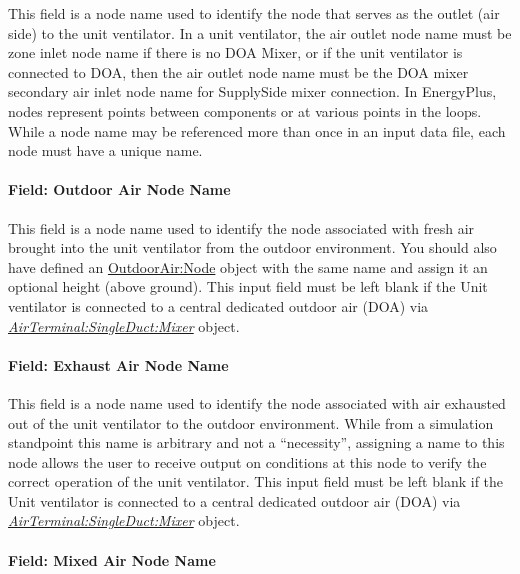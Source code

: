 This field is a node name used to identify the node that serves as the outlet (air side) to the unit ventilator. In a unit ventilator, the air outlet node name must be zone inlet node name if there is no DOA Mixer, or if the unit ventilator is connected to DOA, then the air outlet node name must be the DOA mixer secondary air inlet node name for SupplySide mixer connection. In EnergyPlus, nodes represent points between components or at various points in the loops. While a node name may be referenced more than once in an input data file, each node must have a unique name.

\paragraph{Field: Outdoor Air Node Name}\label{field-outdoor-air-node-name-001}

This field is a node name used to identify the node associated with fresh air brought into the unit ventilator from the outdoor environment. You should also have defined an \hyperref[outdoorairnode]{OutdoorAir:Node} object with the same name and assign it an optional height (above ground). This input field must be left blank if the Unit ventilator is connected to a central dedicated outdoor air (DOA) via \textit{\hyperref[airterminalsingleductmixer]{AirTerminal:SingleDuct:Mixer}} object.

\paragraph{Field: Exhaust Air Node Name}\label{field-exhaust-air-node-name-000}

This field is a node name used to identify the node associated with air exhausted out of the unit ventilator to the outdoor environment. While from a simulation standpoint this name is arbitrary and not a ``necessity'', assigning a name to this node allows the user to receive output on conditions at this node to verify the correct operation of the unit ventilator. This input field must be left blank if the Unit ventilator is connected to a central dedicated outdoor air (DOA) via \textit{\hyperref[airterminalsingleductmixer]{AirTerminal:SingleDuct:Mixer}} object.

\paragraph{Field: Mixed Air Node Name}\label{field-mixed-air-node-name-001}

